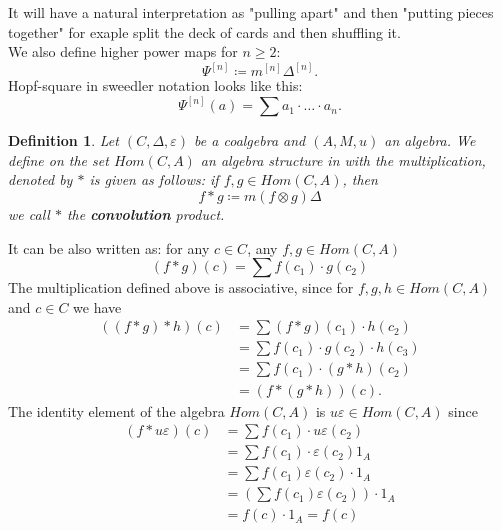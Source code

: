\documentclass[a4paper]{article}
\newtheorem{definition}{Definition}
\begin{document}
It will have a natural interpretation as "pulling apart" and then "putting pieces together" for
exaple split the deck of cards and then shuffling it. \\[4pt]
We also define higher power maps for $n \geq 2$:
\begin{equation*}
\Psi^{[n]} \coloneqq m^{[n]}\Delta^{[n]}.
\end{equation*}
Hopf-square in sweedler notation looks like this:
\begin{equation*}
\Psi^{[n]}(a) = \sum a_1 \cdot \ldots \cdot a_n.
\end{equation*}
\begin{definition}
Let $(C, \Delta, \varepsilon)$ be a coalgebra and $(A, M, u)$ an algebra. We define on the set $Hom(C, A)$
an algebra structure in with the multiplication, denoted by $*$ is given as follows: if
$f, g \in Hom(C, A)$, then
\begin{equation*}
f*g \coloneqq m(f \otimes g)\Delta
\end{equation*}
we call $*$ the \textbf{convolution} product.
\end{definition}
It can be also written as: for any $c \in C$, any $f, g \in Hom(C, A)$
\begin{equation*}
(f*g)(c) = \sum f(c_1) \cdot g(c_2)
\end{equation*}
The multiplication defined above is associative, since for $f, g, h \in Hom(C, A)$ and
$c \in C$ we have
\begin{align*}
((f*g)*h)(c) &= \sum(f*g)(c_1)\cdot h(c_2) \\
&= \sum f(c_1) \cdot g(c_2) \cdot h(c_3) \\
&= \sum f(c_1) \cdot (g*h)(c_2) \\
&= (f*(g*h))(c).
\end{align*}
The identity element of the algebra $Hom(C, A)$ is $u\varepsilon \in Hom(C, A)$ since
\begin{align*}
(f * u\varepsilon)(c) &= \sum f(c_1) \cdot u\varepsilon(c_2) \\
&= \sum f(c_1) \cdot \varepsilon(c_2)1_A \\
&= \sum f(c_1)\varepsilon(c_2) \cdot 1_A \\
&= \left(\sum f(c_1)\varepsilon(c_2)\right)\cdot 1_A \\
&= f(c) \cdot 1_A = f(c)
\end{align*}
\end{document}
